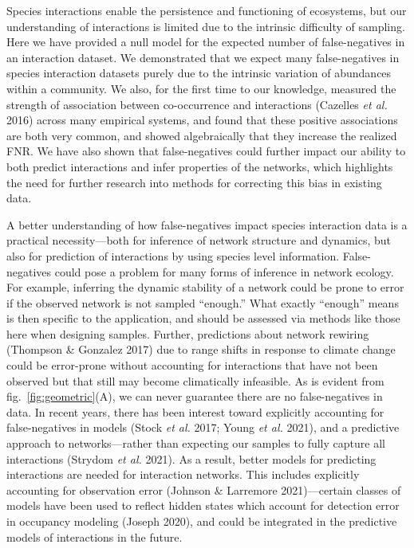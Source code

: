 \documentclass[10pt,oneside]{article}
\begin{document}
Species interactions enable the persistence and functioning of
ecosystems, but our understanding of interactions is limited due to the
intrinsic difficulty of sampling. Here we have provided a null model for
the expected number of false-negatives in an interaction dataset. We
demonstrated that we expect many false-negatives in species interaction
datasets purely due to the intrinsic variation of abundances within a
community. We also, for the first time to our knowledge, measured the
strength of association between co-occurrence and interactions (Cazelles
\emph{et al.} 2016) across many empirical systems, and found that these
positive associations are both very common, and showed algebraically
that they increase the realized FNR. We have also shown that
false-negatives could further impact our ability to both predict
interactions and infer properties of the networks, which highlights the
need for further research into methods for correcting this bias in
existing data.

A better understanding of how false-negatives impact species interaction
data is a practical necessity---both for inference of network structure
and dynamics, but also for prediction of interactions by using species
level information. False-negatives could pose a problem for many forms
of inference in network ecology. For example, inferring the dynamic
stability of a network could be prone to error if the observed network
is not sampled ``enough.'' What exactly ``enough'' means is then
specific to the application, and should be assessed via methods like
those here when designing samples. Further, predictions about network
rewiring (Thompson \& Gonzalez 2017) due to range shifts in response to
climate change could be error-prone without accounting for interactions
that have not been observed but that still may become climatically
infeasible. As is evident from fig.~\ref{fig:geometric}(A), we can never
guarantee there are no false-negatives in data. In recent years, there
has been interest toward explicitly accounting for false-negatives in
models (Stock \emph{et al.} 2017; Young \emph{et al.} 2021), and a
predictive approach to networks---rather than expecting our samples to
fully capture all interactions (Strydom \emph{et al.} 2021). As a
result, better models for predicting interactions are needed for
interaction networks. This includes explicitly accounting for
observation error (Johnson \& Larremore 2021)---certain classes of
models have been used to reflect hidden states which account for
detection error in occupancy modeling (Joseph 2020), and could be
integrated in the predictive models of interactions in the future.
\end{document}
